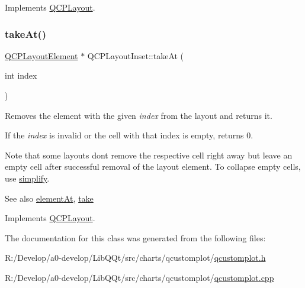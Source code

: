 Implements \mbox{\hyperlink{class_q_c_p_layout_ada26cd17e56472b0b4d7fbbc96873e4c}{Q\+C\+P\+Layout}}.

\mbox{\label{class_q_c_p_layout_inset_ad6756a3b507e20496aaf7f5ca16c47d1}} 
\subsubsection{\texorpdfstring{take\+At()}{takeAt()}}
{\footnotesize\ttfamily \mbox{\hyperlink{class_q_c_p_layout_element}{Q\+C\+P\+Layout\+Element}} $\ast$ Q\+C\+P\+Layout\+Inset\+::take\+At (\begin{DoxyParamCaption}\item[{int}]{index }\end{DoxyParamCaption})\hspace{0.3cm}{\ttfamily [virtual]}}

Removes the element with the given {\itshape index} from the layout and returns it.

If the {\itshape index} is invalid or the cell with that index is empty, returns 0.

Note that some layouts don\textquotesingle{}t remove the respective cell right away but leave an empty cell after successful removal of the layout element. To collapse empty cells, use \mbox{\hyperlink{class_q_c_p_layout_inset_abb9eb23bf2d7c587a8abe02d065eae0a}{simplify}}.

\begin{DoxySeeAlso}{See also}
\mbox{\hyperlink{class_q_c_p_layout_inset_a832e049f0bb32e7db0490a9c904098df}{element\+At}}, \mbox{\hyperlink{class_q_c_p_layout_inset_a9ac707ccff650633b97f52dd5cddcf49}{take}} 
\end{DoxySeeAlso}


Implements \mbox{\hyperlink{class_q_c_p_layout_a5a79621fa0a6eabb8b520cfc04fb601a}{Q\+C\+P\+Layout}}.



The documentation for this class was generated from the following files\+:\begin{DoxyCompactItemize}
\item 
R\+:/\+Develop/a0-\/develop/\+Lib\+Q\+Qt/src/charts/qcustomplot/\mbox{\hyperlink{qcustomplot_8h}{qcustomplot.\+h}}\item 
R\+:/\+Develop/a0-\/develop/\+Lib\+Q\+Qt/src/charts/qcustomplot/\mbox{\hyperlink{qcustomplot_8cpp}{qcustomplot.\+cpp}}\end{DoxyCompactItemize}

